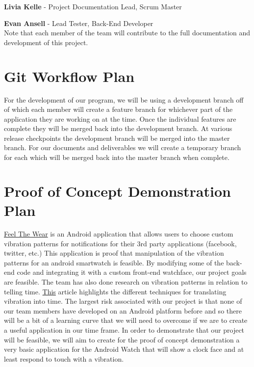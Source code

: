 ﻿\documentclass{article}
\begin{document}
\noindent
\textbf{Livia Kelle} - Project Documentation Lead, Scrum Master

\noindent
\textbf{Evan Ansell} - Lead Tester, Back-End Developer \\
Note that each member of the team will contribute to the full documentation and development of this project.

\section{Git Workflow Plan}

For the development of our program, we will be using a development branch off of which each member will create a feature branch for whichever part of the application they are working on at the time. Once the individual features are complete they will be merged back into the development branch. At various release checkpoints the development branch will be merged into the master branch.
\noindent
For our documents and deliverables we will create a temporary branch for each which will be merged back into the master branch when complete.


\section{Proof of Concept Demonstration Plan}

\href{https://play.google.com/store/apps/details?id=sk.martinflorek.wear.feelthewear&hl=en}{Feel The Wear} is an Android application that allows users to choose custom vibration patterns for notifications for their 3rd party applications (facebook, twitter, etc.) This application is proof that manipulation of the vibration patterns for an android smartwatch is feasible. By modifying some of the back-end code and integrating it with a custom front-end watchface, our project goals are feasible. The team has also done research on vibration patterns in relation to telling time. \href{https://link.springer.com/chapter/10.1007/978-3-540-69057-3_116}{This} article highlights the different techniques for translating vibration into time. 
\noindent
The largest risk associated with our project is that none of our team members have developed on an Android platform before and so there will be a bit of a learning curve that we will need to overcome if we are to create a useful application in our time frame. In order to demonstrate that our project will be feasible, we will aim to create for the proof of concept demonstration a very basic application for the Android Watch that will show a clock face and at least respond to touch with a vibration.
\end{document}
